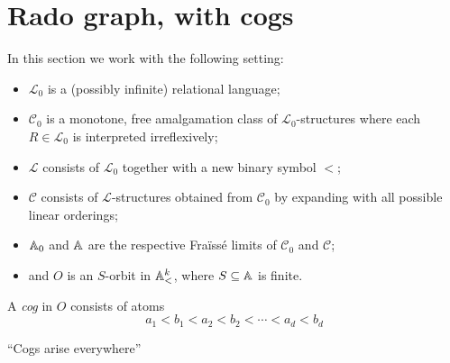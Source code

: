 \section{Rado graph, with cogs}
In this section we work with the following setting:
\begin{itemize}
    \item 
    $\mathcal{L}_0$ is a (possibly infinite) relational language;

    \item 
    $\mathcal{C}_0$ is a monotone, free amalgamation class of $\mathcal{L}_0$-structures 
    where each $R \in \mathcal{L}_0$ is interpreted irreflexively;

    \item 
    $\mathcal{L}$ consists of $\mathcal{L}_0$ together with a new binary symbol $<$;

    \item 
    $\mathcal{C}$ consists of $\mathcal{L}$-structures obtained from $\mathcal{C}_0$ by expanding with all possible linear orderings;

    \item 
    $\mathbb{A}_0$ and $\mathbb{A}$ are the respective Fraïssé limits of $\mathcal{C}_0$ and $\mathcal{C}$;

    \item 
    and $O$ is an $S$-orbit in $\mathbb{A}^k_<$, where $S \subseteq \mathbb{A}$ is finite.
\end{itemize}

\begin{definition}
    A \emph{cog} in $O$ consists of atoms
    \[
        a_1 < b_1 < a_2 < b_2 < \cdots < a_d < b_d
    \]
\end{definition}

\begin{proposition}
    ``Cogs arise everywhere''
\end{proposition}

